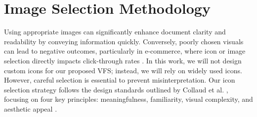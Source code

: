 \documentclass[manuscript,screen,review]{acmart}
\begin{document}
\section{Image Selection Methodology}\label{Image_Selection_Methodology}




	Using appropriate images can significantly enhance document clarity and readability by conveying information quickly. Conversely, poorly chosen visuals can lead to negative outcomes, particularly in e-commerce, where icon or image selection directly impacts click-through rates \cite{Hyun2022} \cite{10.1145/3543873.3584646}. In this work, we will not design custom icons for our proposed VFS; instead, we will rely on widely used icons. However, careful selection is essential to prevent misinterpretation. Our icon selection strategy follows the design standards outlined by Collaud et al. , focusing on four key principles: meaningfulness, familiarity, visual complexity, and aesthetic appeal \cite{COLLAUD2022102290}.
	
\end{document}
